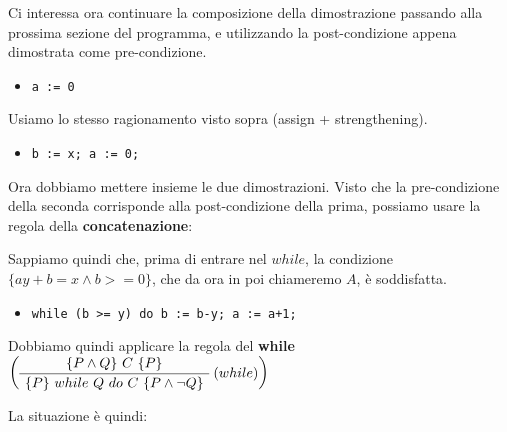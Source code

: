 \documentclass[a4paper,11pt]{report}
\begin{document}
Ci interessa ora continuare la composizione della dimostrazione passando alla prossima sezione del programma, e utilizzando la post-condizione appena dimostrata come pre-condizione.

\begin{itemize}
    \item \texttt{a := 0}
\end{itemize}

Usiamo lo stesso ragionamento visto sopra (assign + strengthening).

\begin{prooftree}
\end{prooftree}

\begin{itemize}
    \item \texttt{b := x; a := 0;}
\end{itemize}

Ora dobbiamo mettere insieme le due dimostrazioni. Visto che la pre-condizione della seconda corrisponde alla post-condizione della prima, possiamo usare la regola della \textbf{concatenazione}:

\begin{prooftree}
\end{prooftree}

Sappiamo quindi che, prima di entrare nel \( while \), la condizione \( \{ay + b = x \land b >= 0\} \), che da ora in poi chiameremo \( A \), è soddisfatta.

\begin{itemize}
    \item \texttt{while (b >= y) do b := b-y; a := a+1;}
\end{itemize}

Dobbiamo quindi applicare la regola del \textbf{while} 
{\color{gray}
    \(\left(
\AxiomC{$\{P \wedge Q\} \ C \ \{P\}$}
\RightLabel{$(while)$}
\UnaryInfC{$\{P\} \ while \ Q \ do \ C \ \{P \wedge \neg Q\}$}
\DisplayProof
\right)
\)
}

La situazione è quindi:
\end{document}
